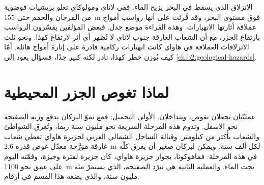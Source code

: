 \begin{omfigure}
\par{}
\end{omfigure}

الانزلاق الذي يسقط في البحر يزيح الماء. ففي لاناي ومولوكاي تعلو بريشيات فوضوية
من المرجان والحمم حتى \qty{155}{m} فوق مستوى البحر، وقد قُرئت على أنها رواسب
أمواج عملاقة أثارتها الانهيارات. وهذه القراءة موضع جدل. فبعض المؤلفين يفسّرون الرواسب
بارتفاع الجزر، مع أن الشعاب الغارقة جنوب لاناي لا تُظهر أي أثر لارتفاع كهذا.
ونحو ثلث الانزلاقات العملاقة في هاواي كانت انهيارات ركامية قادرة على إثارة أمواج هائلة. أمّا كيف
يُوزن خطر كهذا، نادر لكنه كبير جدًا، فسؤال يعود إلى \cref{ch:b2:geological-hazards}.

\section{لماذا تغوص الجزر المحيطية}\label{sec:b2:oceanic-islands:subsidence}

عمليّتان تجعلان  تغوص، وتتداخلان. الأولى التحميل: فمع نموّ البركان
يدفع وزنه الصفيحة نحو الأسفل. وتدوم هذه المرحلة السريعة نحو مليون سنة ربما، وتُغرق
الشواطئ والشعاب بأكثر من كيلومتر. وقبالة الساحل الشمالي الغربي لجزيرة هاواي تعطي
شعاب غارقة مؤرَّخة معدّل غوص قدره \qty{2.6}{m} لكل ألف سنة. ويمكن لبركان صغير أن
يغرق كلّه في هذه المرحلة: فماهوكونا، بجوار جزيرة هاواي، كان جزيرة لفترة وجيزة، وقمّته
اليوم على عمق نحو \qty{1100}{m} تحت الماء.
والعملية الثانية هي تبرّد الصفيحة، الذي
يستمرّ مئة مليون سنة، والذي يضعه هذا القسم في أرقام.

